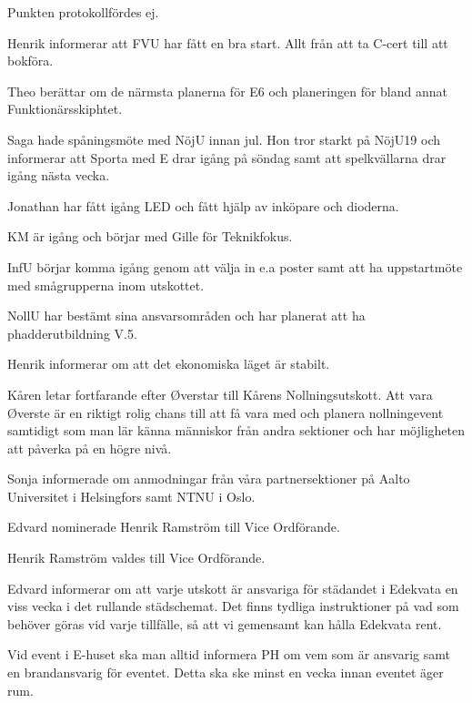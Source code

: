\documentclass[10pt]{article}
\begin{document}
\begin{paragrafer}
\begin{paragrafer}
Punkten protokollfördes ej.


Henrik informerar att FVU har fått en bra start. Allt från att ta C-cert till att bokföra.

Theo berättar om de närmsta planerna för E6 och planeringen för bland annat Funktionärsskiphtet.

Saga hade spåningsmöte med NöjU innan jul. Hon tror starkt på NöjU19 och informerar att Sporta med E drar igång på söndag samt att spelkvällarna drar igång nästa vecka.

Jonathan har fått igång LED och fått hjälp av inköpare och dioderna.

KM är igång och börjar med Gille för Teknikfokus. 

InfU börjar komma igång genom att välja in e.a poster samt att ha uppstartmöte med smågrupperna inom utskottet.

NollU har bestämt sina ansvarsområden och har planerat att ha phadderutbildning V.5.

Henrik informerar om att det ekonomiska läget är stabilt.


Kåren letar fortfarande efter Øverstar till Kårens Nollningsutskott. Att vara Øverste är en riktigt rolig chans till att få vara med och planera nollningevent samtidigt som man lär känna människor från andra sektioner och har möjligheten att påverka på en högre nivå.

Sonja informerade om anmodningar från våra partnersektioner på Aalto Universitet i Helsingfors samt NTNU i Oslo.
\end{paragrafer}

Edvard nominerade Henrik Ramström till Vice Ordförande.

Henrik Ramström valdes till Vice Ordförande.

Edvard informerar om att varje utskott är ansvariga för städandet i Edekvata en viss vecka i det rullande städschemat. Det finns tydliga instruktioner på vad som behöver göras vid varje tillfälle, så att vi gemensamt kan hålla Edekvata rent.

Vid event i E-huset ska man alltid informera PH om vem som är ansvarig samt en brandansvarig för eventet. Detta ska ske minst en vecka innan eventet äger rum.


\end{paragrafer}
\end{document}
